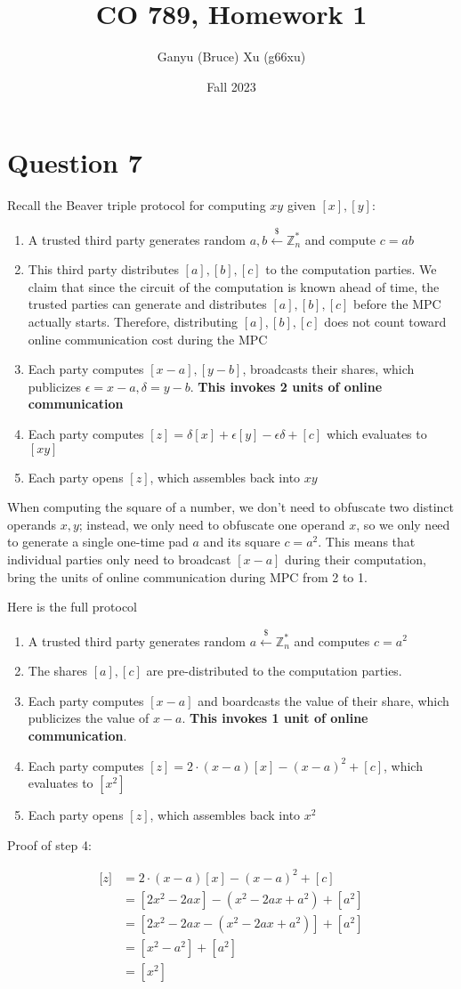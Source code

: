 \documentclass{article}
\title{CO 789, Homework 1}
\author{Ganyu (Bruce) Xu (g66xu)}
\date{Fall 2023}
\newcommand{\leftsample}{\overset{{\scriptscriptstyle\$}}{\leftarrow}}
\begin{document}

\section*{Question 7}
Recall the Beaver triple protocol for computing $xy$ given $[x], [y]$:

\begin{enumerate}
    \item A trusted third party generates random $a, b \leftsample \mathbb{Z}_n^\ast$ and compute $c = ab$
    \item This third party distributes $[a], [b], [c]$ to the computation parties. We claim that since the circuit of the computation is known ahead of time, the trusted parties can generate and distributes $[a], [b], [c]$ before the MPC actually starts. Therefore, distributing $[a], [b], [c]$ does not count toward online communication cost during the MPC
    \item Each party computes $[x-a], [y-b]$, broadcasts their shares, which publicizes $\epsilon = x-a, \delta = y-b$. \textbf{This invokes 2 units of online communication}
    \item Each party computes $[z] = \delta[x] + \epsilon[y] - \epsilon\delta + [c]$ which evaluates to $[xy]$
    \item Each party opens $[z]$, which assembles back into $xy$
\end{enumerate}

When computing the square of a number, we don't need to obfuscate two distinct operands $x, y$; instead, we only need to obfuscate one operand $x$, so we only need to generate a single one-time pad $a$ and its square $c = a^2$. This means that individual parties only need to broadcast $[x-a]$ during their computation, bring the units of online communication during MPC from 2 to 1.

Here is the full protocol

\begin{enumerate}
    \item A trusted third party generates random $a \leftsample \mathbb{Z}_n^\ast$ and computes $c = a^2$
    \item The shares $[a], [c]$ are pre-distributed to the computation parties.
    \item Each party computes $[x-a]$ and boardcasts the value of their share, which publicizes the value of $x-a$. \textbf{This invokes 1 unit of online communication}.
    \item Each party computes $[z] = 2\cdot (x-a)[x] - (x-a)^2 + [c]$, which evaluates to $[x^2]$
    \item Each party opens $[z]$, which assembles back into $x^2$
\end{enumerate}

Proof of step 4:

$$
\begin{aligned}
    \lbrack z \rbrack &= 2\cdot (x-a)[x] - (x-a)^2 + [c] \\
    &= [2x^2 - 2ax] - (x^2 - 2ax + a^2) + [a^2] \\
    &= [2x^2 - 2ax - (x^2 - 2ax + a^2)] + [a^2] \\
    &= [x^2 - a^2] + [a^2] \\
    &= [x^2]
\end{aligned}
$$
\end{document}
